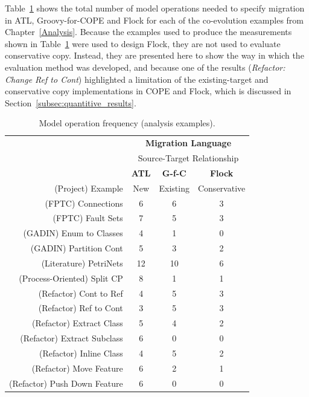 Table~\ref{tab:model_operations_results_analysis_examples} shows the total number of model operations needed to specify migration in ATL, Groovy-for-COPE and Flock for each of the co-evolution examples from Chapter~\ref{Analysis}. Because the examples used to produce the measurements shown in Table~\ref{tab:model_operations_results_analysis_examples} were used to design Flock, they are not used to evaluate conservative copy. Instead, they are presented here to show the way in which the evaluation method was developed, and because one of the results (\emph{Refactor: Change Ref to Cont}) highlighted a limitation of the existing-target and conservative copy implementations in COPE and Flock, which is discussed in Section~\ref{subsec:quantitive_results}.

\begin{table}[tbp]
	\centering
	\begin{tabular}{|r|c|c|c|}
		\hline
		                              & \multicolumn{3}{|c|}{\textbf{Migration Language}} \\
													  			& \multicolumn{3}{|c|}{Source-Target Relationship} \\
		\hline
		                              & \textbf{ATL} & \textbf{G-f-C} & \textbf{Flock} \\
		(Project) Example             & New & Existing & Conservative \\
		\hline
		\hline
		(FPTC) Connections            & 6  & 6   & 3  \\
		\hline
		(FPTC) Fault Sets             & 7  & 5   & 3  \\
		\hline
		(GADIN) Enum to Classes       & 4  & 1   & 0  \\
		\hline
		(GADIN) Partition Cont        & 5  & 3   & 2  \\
		\hline
		(Literature) PetriNets        & 12  & 10   & 6  \\
		\hline
		(Process-Oriented) Split CP   & 8  & 1   & 1  \\
		\hline
		(Refactor) Cont to Ref        & 4  & 5   & 3  \\
		\hline
		(Refactor) Ref to Cont        & 3  & 5   & 3  \\
		\hline
		(Refactor) Extract Class      & 5  & 4   & 2  \\
		\hline
		(Refactor) Extract Subclass   & 6  & 0   & 0  \\
		\hline
		(Refactor) Inline Class       & 4  & 5   & 2  \\
		\hline
		(Refactor) Move Feature       & 6  & 2   & 1  \\
		\hline
		(Refactor) Push Down Feature  & 6  & 0 & 0  \\
		\hline
	\end{tabular}
	\caption{Model operation frequency (analysis examples).}
	\label{tab:model_operations_results_analysis_examples}
\end{table}

